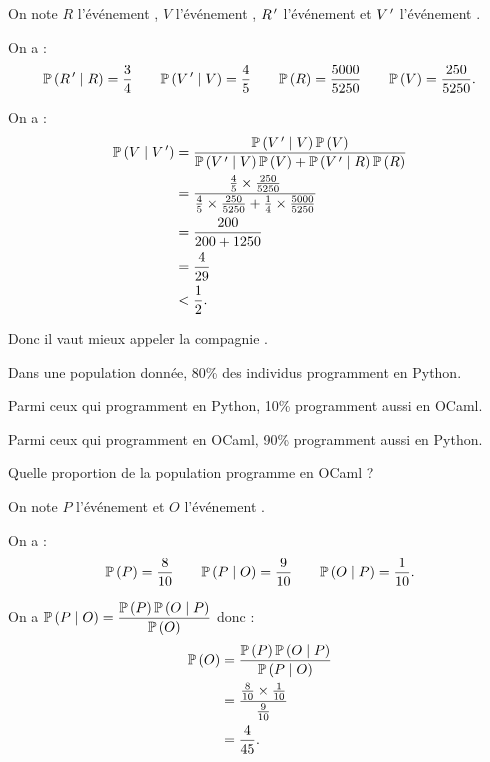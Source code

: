 \begin{corr}
On note \(R\) l'événement , \(V\) l'événement , \(R^{\,\prime}\) l'événement  et \(V^{\,\prime}\) l'événement .

On a : \[\mathbb{P}\left(R^{\,\prime}\mid R\right)=\dfrac{3}{4}\qquad\mathbb{P}\left(V^{\,\prime}\mid V\right)=\dfrac{4}{5}\qquad\mathbb{P}\left(R\right)=\dfrac{5000}{5250}\qquad\mathbb{P}\left(V\right)=\dfrac{250}{5250}.\]

On a : \[\begin{aligned}
\mathbb{P}\left(V\mid V^{\,\prime}\right)&=\dfrac{\mathbb{P}\left(V^{\,\prime}\mid V\right)\mathbb{P}\left(V\right)}{\mathbb{P}\left(V^{\,\prime}\mid V\right)\mathbb{P}\left(V\right)+\mathbb{P}\left(V^{\,\prime}\mid R\right)\mathbb{P}\left(R\right)} \\
&=\dfrac{\frac{4}{5}\times\frac{250}{5250}}{\frac{4}{5}\times\frac{250}{5250}+\frac{1}{4}\times\frac{5000}{5250}} \\
&=\dfrac{200}{200+1250} \\
&=\dfrac{4}{29} \\
&<\dfrac{1}{2}.
\end{aligned}\]

Donc il vaut mieux appeler la compagnie .
\end{corr}

\begin{exo}[Exercice 5]
Dans une population donnée, 80\% des individus programment en Python.

Parmi ceux qui programment en Python, 10\% programment aussi en OCaml.

Parmi ceux qui programment en OCaml, 90\% programment aussi en Python.

Quelle proportion de la population programme en OCaml ?
\end{exo}

\begin{corr}
On note \(P\) l'événement  et \(O\) l'événement .

On a : \[\mathbb{P}\left(P\right)=\dfrac{8}{10}\qquad\mathbb{P}\left(P\mid O\right)=\dfrac{9}{10}\qquad\mathbb{P}\left(O\mid P\right)=\dfrac{1}{10}.\]

On a \(\mathbb{P}\left(P\mid O\right)=\dfrac{\mathbb{P}\left(P\right)\mathbb{P}\left(O\mid P\right)}{\mathbb{P}\left(O\right)}\) donc : \[\begin{aligned}
\mathbb{P}\left(O\right)&=\dfrac{\mathbb{P}\left(P\right)\mathbb{P}\left(O\mid P\right)}{\mathbb{P}\left(P\mid O\right)} \\
&=\dfrac{\frac{8}{10}\times\frac{1}{10}}{\frac{9}{10}} \\
&=\dfrac{4}{45}.
\end{aligned}\]
\end{corr}

